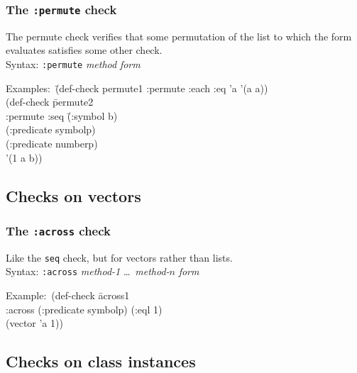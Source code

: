 \documentclass{article}
\begin{document}
\subsubsection{The \texttt{:permute} check} 
The permute check verifies that some permutation of the list to which
the form evaluates satisfies some other check.
\\ Syntax: \texttt{:permute} \textit{method} \textit{form}
{\ttfamily\begin{tabbing}
\textrm{Examples:}\ \=(def-check permute1 :permute :each :eq 'a '(a a))
\\ \> (def-check \=permute2
\\ \> \>  :permute :seq \=(:symbol b)
\\ \> \>              \>(:predicate symbolp)
\\ \> \>              \>(:predicate numberp)
\\ \> \>'(1 a b))
\end{tabbing}}

\subsection{Checks on vectors}
\subsubsection{The \texttt{:across} check} 
Like the \texttt{seq} check, but for vectors rather than
lists.
\\ Syntax: \texttt{:across} \textit{method-1} \ldots\ \textit{method-$n$} \textit{form}
{\ttfamily\begin{tabbing}
\textrm{Example:}\ (def-check \=across1
\\ \>  :across (:predicate symbolp) (:eql 1)
\\ \>  (vector 'a 1))
\end{tabbing}}

\subsection{Checks on class instances}
\end{document}
